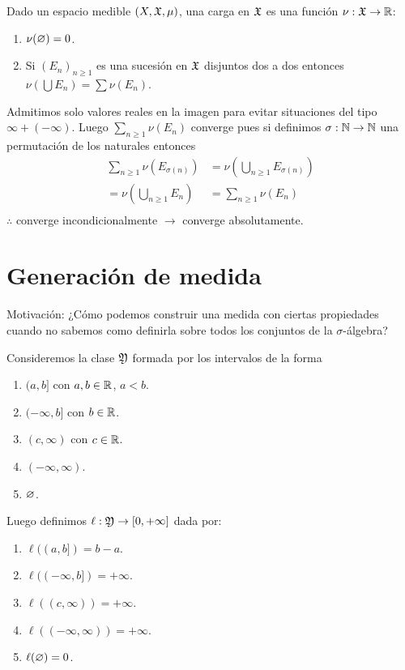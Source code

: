 \begin{definition}[Carga]
    Dado un espacio medible $(X, \mathfrak{X}, \mu)$, una carga en $\mathfrak{X}$ es una función $\nu : \mathfrak{X} \to \mathbb{R}$: \begin{enumerate}
        \item $\nu(\varnothing) = 0$.
        \item Si $(E_n)_{n \geq 1}$ es una sucesión en $\mathfrak{X}$ disjuntos dos a dos entonces $\nu(\bigcup E_n) = \sum \nu(E_n)$.
    \end{enumerate}

    Admitimos solo valores reales en la imagen para evitar situaciones del tipo $\infty + (-\infty)$.
    Luego $\sum_{n \geq 1} \nu(E_n)$ converge pues si definimos $\sigma : \mathbb{N} \to \mathbb{N}$ una permutación de los naturales entonces
    \begin{align*}
        \sum_{n \geq 1} \nu(E_{\sigma(n)}) & = \nu (\bigcup_{n \geq 1} E_{\sigma(n)}) \\
        = \nu (\bigcup_{n \geq 1} E_n)     & = \sum_{n \geq 1} \nu(E_{n})             \\
    \end{align*}
    $\therefore$ converge incondicionalmente $\to$ converge absolutamente.
\end{definition}

\section{Generación de medida}

Motivación: ¿Cómo podemos construir una medida con ciertas propiedades
cuando no sabemos como definirla sobre todos los conjuntos de la $\sigma$-álgebra?

Consideremos la clase $\mathfrak{Y}$ formada por los intervalos de la forma \begin{enumerate}
    \item $(a, b]$ con $a, b \in \mathbb{R}$, $a<b$.
    \item $(-\infty, b]$ con $b \in \mathbb{R}$.
    \item $(c, \infty)$ con $c \in \mathbb{R}$.
    \item $(-\infty, \infty)$.
    \item $\varnothing$.
\end{enumerate}

Luego definimos $\ell: \mathfrak{Y} \to [0, +\infty]$ dada por: \begin{enumerate}
    \item $\ell((a, b]) = b - a$.
    \item $\ell((-\infty, b]) = +\infty$.
    \item $\ell((c, \infty)) = +\infty$.
    \item $\ell((-\infty, \infty)) = +\infty$.
    \item $\ell(\varnothing) = 0$.
\end{enumerate}


